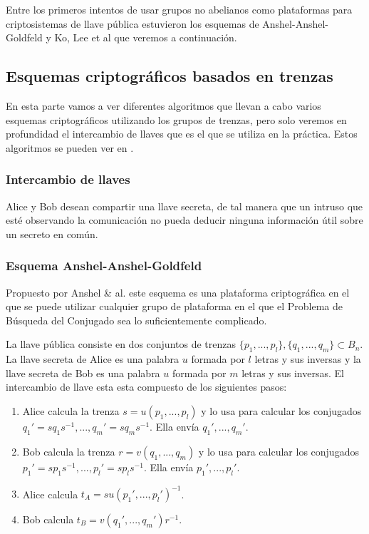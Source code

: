 \documentclass[12pt]{article}
\theoremstyle{definition}
\begin{document}
Entre los primeros intentos de usar grupos no abelianos como plataformas para criptosistemas de llave pública estuvieron los esquemas de Anshel-Anshel-Goldfeld y Ko, Lee et al que veremos a continuación.





\subsection{Esquemas criptográficos basados en trenzas}

En esta parte vamos a ver diferentes algoritmos que llevan a cabo varios esquemas criptográficos utilizando los grupos de trenzas, pero solo veremos en profundidad el intercambio de llaves que es el que se utiliza en la práctica. Estos algoritmos se pueden ver en \cite{Deh}.

\subsubsection{Intercambio de llaves}
Alice y Bob desean compartir una llave secreta, de tal manera que un intruso que esté observando la comunicación no pueda deducir ninguna información útil sobre un secreto en común.

\subsubsection*{Esquema Anshel-Anshel-Goldfeld}
Propuesto por Anshel \& al. este esquema es una plataforma criptográfica en el que se puede utilizar cualquier grupo de plataforma en el que el Problema de Búsqueda del Conjugado sea lo suficientemente complicado.

La llave pública consiste en dos conjuntos de trenzas $\{p_1,...,p_l\},\{q_1,...,q_m\}\subset B_n$. La llave secreta de Alice es una palabra $u$ formada por $l$ letras y sus inversas y la llave secreta de Bob es una palabra $u$ formada por $m$ letras y sus inversas. El intercambio de llave esta esta compuesto de los siguientes pasos:

\begin{enumerate}
\item Alice calcula la trenza $s = u(p_1,...,p_l)$ y lo usa para calcular los conjugados $q_1'=sq_1s^{-1},...,q_m'=sq_ms^{-1}$. Ella envía $q_1',...,q_m'.$
\item Bob calcula la trenza $r = v(q_1,...,q_m)$ y lo usa para calcular los conjugados $p_1'=sp_1s^{-1},...,p_l'=sp_ls^{-1}$. Ella envía $p_1',...,p_l'.$
\item Alice calcula $t_A = su(p_1',...,p_l')^{-1}$.
\item Bob calcula $t_B = v(q_1',...,q_m')r^{-1}$.
\end{enumerate}
\end{document}
